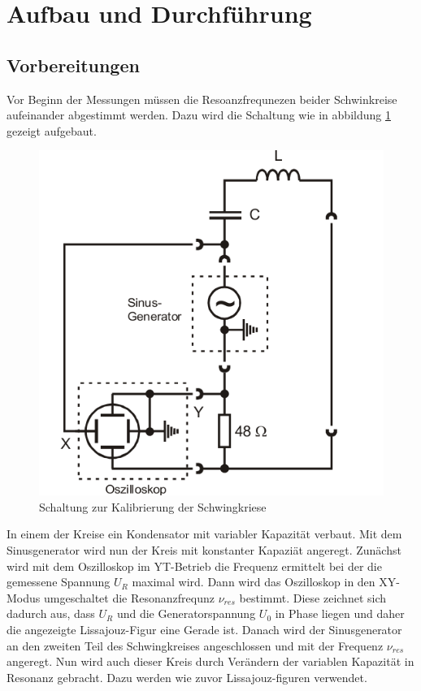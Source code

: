 \documentclass[11pt,ngerman,a4paper]{article}
\begin{document}
\section{Aufbau und Durchf\"{u}hrung}
\subsection{Vorbereitungen}
Vor Beginn der Messungen müssen die Resoanzfrequnezen beider Schwinkreise aufeinander abgestimmt werden. Dazu wird die Schaltung wie in abbildung \ref{abb1} gezeigt aufgebaut.
\begin{figure}[htp]
\centering
\includegraphics[scale=0.5]{Abb/abb1.png}
\caption{Schaltung zur Kalibrierung der Schwingkriese}
\label{abb1}
\end{figure}
In einem der Kreise ein Kondensator mit variabler Kapazität verbaut. Mit dem Sinusgenerator wird nun der Kreis mit konstanter Kapazi\"at angeregt. Zunächst wird mit dem Oszilloskop im YT-Betrieb die Frequenz ermittelt bei der die gemessene Spannung $U_R$ maximal wird. Dann wird das Oszilloskop in den XY-Modus umgeschaltet die Resonanzfrequnz $\nu_{res}$ bestimmt. Diese zeichnet sich dadurch aus, dass $U_R$ und die Generatorspannung $U_0$ in Phase liegen und daher die angezeigte Lissajouz-Figur eine Gerade ist. Danach wird der Sinusgenerator an den zweiten Teil des Schwingkreises angeschlossen und mit der Frequenz $\nu_{res}$ angeregt. Nun wird auch dieser Kreis durch Verändern der variablen Kapazität in Resonanz gebracht. Dazu werden wie zuvor Lissajouz-figuren verwendet. 
\end{document}
